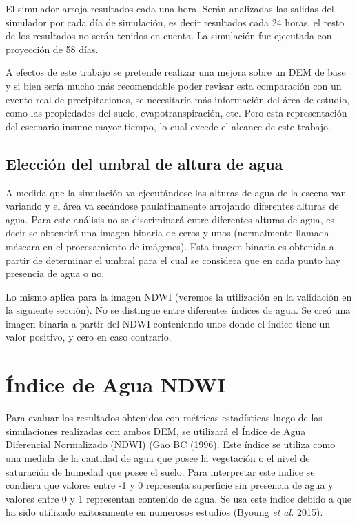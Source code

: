 \documentclass[10pt,a4paper, twoside]{report}
\begin{document}
El simulador arroja resultados cada una hora. Serán analizadas las salidas del simulador por cada día de simulación, es decir resultados cada 24 horas, el resto de los resultados no serán tenidos en cuenta. La simulación fue ejecutada con proyección de 58 días.


A efectos de este trabajo se pretende realizar una mejora sobre un DEM de base y si bien sería mucho más recomendable poder revisar esta comparación con un evento real de precipitaciones, se necesitaría más información del área de estudio, como las propiedades del suelo, evapotranspiración, etc. Pero esta representación del escenario insume mayor tiempo, lo cual excede el alcance de este trabajo.

\subsection{Elección del umbral de altura de agua}

A medida que la simulación va ejecutándose las alturas de agua de la escena van variando y el área va secándose paulatinamente arrojando diferentes alturas de agua. Para este análisis no se discriminará entre diferentes alturas de agua, es decir se obtendrá una imagen binaria de ceros y unos (normalmente llamada máscara en el procesamiento de imágenes). Esta imagen binaria es obtenida a partir de determinar el umbral para el cual se considera que en cada punto hay presencia de agua o no.

Lo mismo aplica para la imagen NDWI (veremos la utilización en la validación en la siguiente sección). No se distingue entre diferentes índices de agua. Se creó una imagen binaria a partir del NDWI conteniendo unos donde el índice tiene un valor positivo, y cero en caso contrario.

\section{Índice de Agua NDWI}
\label{indiceaguandwi}

Para evaluar los resultados obtenidos con métricas estadísticas luego de las simulaciones realizadas con ambos DEM, se utilizará el Índice de Agua Diferencial Normalizado (NDWI) (Gao BC (1996). Este índice se utiliza como una medida de la cantidad de agua que posee la vegetación o el nivel de saturación de humedad que posee el suelo. Para interpretar este indice se condiera que valores entre -1 y 0 representa superficie sin presencia de agua y valores entre 0 y 1 representan contenido de agua. Se usa este índice debido a que ha sido utilizado exitosamente en numerosos estudios (Byoung \textit{et al.} 2015).
\end{document}
